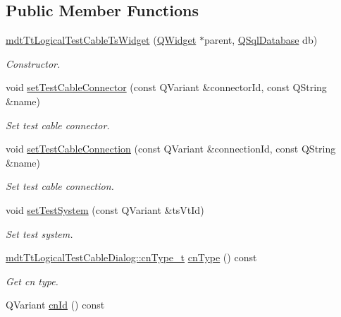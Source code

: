 \subsection*{Public Member Functions}
\begin{DoxyCompactItemize}
\item 
\hyperlink{classmdt_tt_logical_test_cable_ts_widget_ac5addba1598560e467ea342a430c9a1a}{mdt\-Tt\-Logical\-Test\-Cable\-Ts\-Widget} (\hyperlink{class_q_widget}{Q\-Widget} $\ast$parent, \hyperlink{class_q_sql_database}{Q\-Sql\-Database} db)
\begin{DoxyCompactList}\small\item\em Constructor. \end{DoxyCompactList}\item 
void \hyperlink{classmdt_tt_logical_test_cable_ts_widget_afd9166108bc905d461d70e74eac1b92e}{set\-Test\-Cable\-Connector} (const Q\-Variant \&connector\-Id, const Q\-String \&name)
\begin{DoxyCompactList}\small\item\em Set test cable connector. \end{DoxyCompactList}\item 
void \hyperlink{classmdt_tt_logical_test_cable_ts_widget_ab6fa7e861040ac4b81305e8d4967537d}{set\-Test\-Cable\-Connection} (const Q\-Variant \&connection\-Id, const Q\-String \&name)
\begin{DoxyCompactList}\small\item\em Set test cable connection. \end{DoxyCompactList}\item 
void \hyperlink{classmdt_tt_logical_test_cable_ts_widget_ae6e863361f1aa944aed38024c55054b6}{set\-Test\-System} (const Q\-Variant \&ts\-Vt\-Id)
\begin{DoxyCompactList}\small\item\em Set test system. \end{DoxyCompactList}\item 
\hyperlink{classmdt_tt_logical_test_cable_dialog_a3ca0cca0e179adbc5d6a024eb8ec00f8}{mdt\-Tt\-Logical\-Test\-Cable\-Dialog\-::cn\-Type\-\_\-t} \hyperlink{classmdt_tt_logical_test_cable_ts_widget_ae03ff6218dee2d66e2a9ab252f36410d}{cn\-Type} () const 
\begin{DoxyCompactList}\small\item\em Get cn type. \end{DoxyCompactList}\item 
Q\-Variant \hyperlink{classmdt_tt_logical_test_cable_ts_widget_ad3e0b90a8624392daf8581704f9fe3a4}{cn\-Id} () const 

\end{DoxyCompactItemize}
